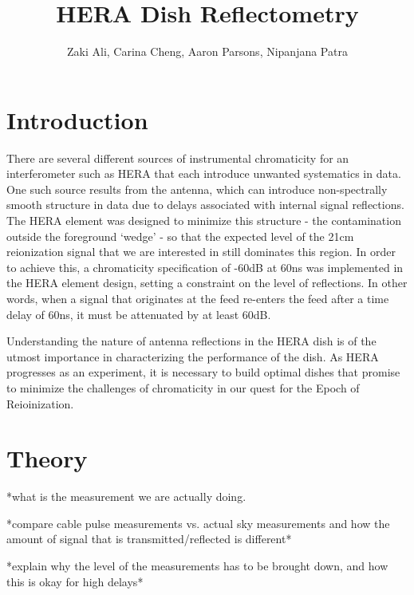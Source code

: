 \documentclass[12pt,preprint]{aastex}
\begin{document}
\title{HERA Dish Reflectometry} 
\author{Zaki Ali, Carina Cheng, Aaron Parsons, Nipanjana Patra}
\maketitle

\section{Introduction}

There are several different sources of instrumental chromaticity for an interferometer such as HERA that each introduce unwanted systematics in data. One such source results from the antenna, which can introduce non-spectrally smooth structure in data due to delays associated with internal signal reflections. The HERA element was designed to minimize this structure - the contamination outside the foreground `wedge' - so that the expected level of the 21cm reionization signal that we are interested in still dominates this region. In order to achieve this, a chromaticity specification of -60dB at 60ns was implemented in the HERA element design, setting a constraint on the level of reflections. In other words, when a signal that originates at the feed re-enters the feed after a time delay of 60ns, it must be attenuated by at least 60dB. 

Understanding the nature of antenna reflections in the HERA dish is of the utmost importance in characterizing the performance of the dish. As HERA progresses as an experiment, it is necessary to build optimal dishes that promise to minimize the challenges of chromaticity in our quest for the Epoch of Reioinization.
\section{Theory}

*what is the measurement we are actually doing. 

*compare cable pulse measurements vs. actual sky measurements and how the amount of signal that is transmitted/reflected is different*

*explain why the level of the measurements has to be brought down, and how this is okay for high delays*
\end{document}

